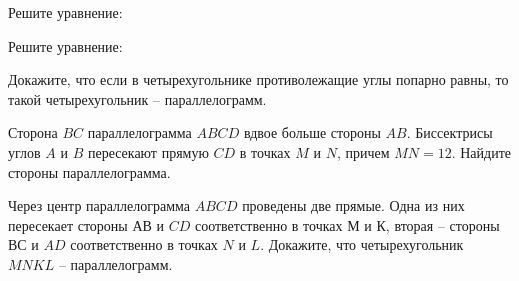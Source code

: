 \begin{homework}[number=2]
	\begin{listofex}
		\item Решите уравнение:
		\begin{enumcols}[itemcolumns=4]
			\item {}
			\item {}
			\item {}
			\item {}
		\end{enumcols}
		\item Решите уравнение:
		\begin{enumcols}[itemcolumns=2]
			\item {}
			\item {}
		\end{enumcols}
	\item Докажите, что если в четырехугольнике противолежащие углы попарно равны, то такой четырехугольник – параллелограмм.
	\item Сторона \( BC \) параллелограмма \( ABCD \) вдвое больше стороны \( AB \). Биссектрисы углов \( A \) и \( B \) пересекают прямую \( CD \) в точках \( M \) и \( N \), причем \( MN=12 \). Найдите стороны параллелограмма.
	\item Через центр параллелограмма \( ABCD \) проведены две прямые. Одна из них пересекает стороны \( АВ \) и \( CD \) соответственно в точках \( М \) и \( К \), вторая -- стороны \( ВС \) и \( AD \) соответственно в точках \( N \) и \( L \). Докажите, что четырехугольник \( MNKL \) -- параллелограмм.
	\end{listofex}
\end{homework}
%
